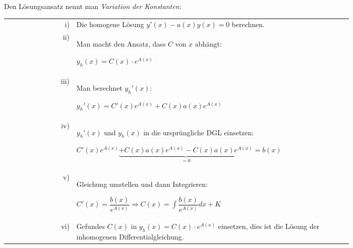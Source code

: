 \documentclass[a4paper, fontsize = 8pt, landscape]{scrartcl}
\begin{document}
\begin{multicols*}{3}
    Den Lösungsansatz nennt man \emph{Variation der Konstanten}:

    \begin{center}
        \renewcommand{\arraystretch}{1.5}
        \begin{tabular}{r p{0.8\linewidth}} \toprule
            i)   & Die homogene Lösung $y'(x) - a(x) y(x) = 0$ berechnen.                                                                  \\
            ii)  & Man macht den Ansatz, dass $C$ von $x$ abhängt:

            \begin{center}
                $y_h(x) = C(x) \cdot e^{A(x)}$
            \end{center}                                                                            \\
            iii) & Man berechnet $y_h'(x)$:

            \begin{center}
                $y_h'(x) = C'(x)e^{A(x)} + C(x) a(x) e^{A(x)}$
            \end{center}                                      \\
            iv)  & $y_h'(x)$ und $y_h(x)$ in die ursprüngliche DGL einsetzen:

            \begin{center}
                $C'(x)e^{A(x)} \underbrace{+ C(x) a(x) e^{A(x)} - C(x) a(x) e^{A(x)}}_{= 0} = b(x)$
            \end{center}                                                            \\
            v)   & Gleichung umstellen und dann Integrieren:

            \begin{center}
                $\displaystyle C'(x) = \dfrac{b(x)}{e^{A(x)}} \Rightarrow C(x) = \int \dfrac{b(x)}{e^{A(x)}} dx + K$
            \end{center}                          \\
            vi)  & Gefundes $C(x)$ in $y_h(x) = C(x) \cdot e^{A(x)}$ einsetzen, dies ist die Lösung der inhomogenen Differentialgleichung.
            \\
            \bottomrule
        \end{tabular}
    \end{center}

\end{multicols*}
\end{document}
